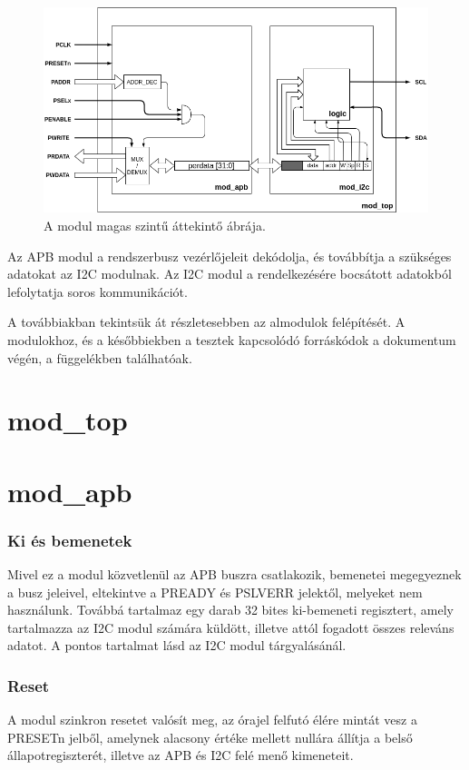 \begin{figure}[ht!]
    \includegraphics[width=\textwidth]{figures/overview}
    \caption{A modul magas szintű áttekintő ábrája.}
    \label{fig:modtop}
\end{figure}

Az APB modul a rendszerbusz vezérlőjeleit dekódolja, és továbbítja a szükséges adatokat az I2C modulnak.
Az I2C modul a rendelkezésére bocsátott adatokból lefolytatja soros kommunikációt.

A továbbiakban tekintsük át részletesebben az almodulok felépítését. A modulokhoz, és a későbbiekben a tesztek kapcsolódó forráskódok a dokumentum végén, a függelékben találhatóak.

\section{mod\_top}

\section{mod\_apb}
\subsubsection{Ki és bemenetek}
Mivel ez a modul közvetlenül az APB buszra csatlakozik, bemenetei megegyeznek a busz jeleivel, eltekintve a PREADY és PSLVERR jelektől, melyeket nem használunk. Továbbá tartalmaz egy darab 32 bites ki-bemeneti regisztert, amely tartalmazza az I2C modul számára küldött, illetve attól fogadott összes releváns adatot. A pontos tartalmat lásd az I2C modul tárgyalásánál.

\subsubsection{Reset}
    A modul szinkron resetet valósít meg, az órajel felfutó élére mintát vesz a PRESETn jelből, amelynek alacsony értéke mellett nullára állítja a belső állapotregiszterét, illetve az APB és I2C felé menő kimeneteit.

